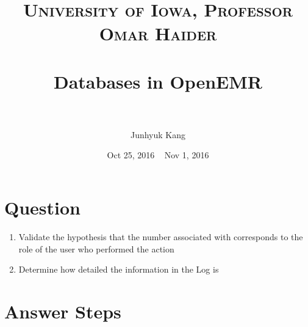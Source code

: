 \documentclass[paper=a4, fontsize=11pt]{scrartcl} %
\title{	
\normalfont \normalsize 
\textsc{University of Iowa, Professor Omar Haider} \\ [25pt] %
\horrule{0.5pt} \\[0.4cm] %
\huge Databases in OpenEMR \\ %
\horrule{2pt} \\[0.5cm] %
}
\author{Junhyuk Kang} %
\date{Oct 25, 2016 ~ Nov 1, 2016 } %
\numberwithin{equation}{section} %
\numberwithin{figure}{section} %
\numberwithin{table}{section} %
\begin{document}
\maketitle %

\section{Question}
\begin{enumerate}
	\item Validate the hypothesis that the number associated with corresponds to the role of the user who performed the action
	\item Determine how detailed the information in the Log is

\end{enumerate}

\section{Answer Steps}
\end{document}
